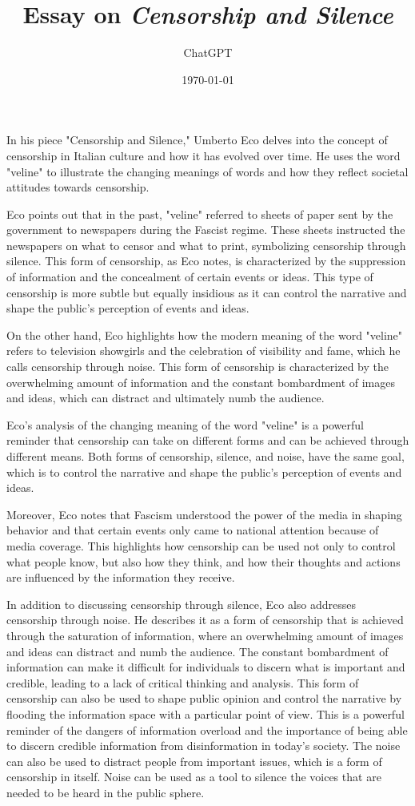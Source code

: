 \documentclass[12pt]{article}
\title{Essay on \emph{Censorship and Silence}}
\author{ChatGPT}
\date{\today}
\begin{document}
\maketitle
In his piece "Censorship and Silence," Umberto Eco delves into the
concept of censorship in Italian culture and how it has evolved
over time. He uses the word "veline" to illustrate the changing
meanings of words and how they reflect societal attitudes towards
censorship.

Eco points out that in the past, "veline" referred to sheets of
paper sent by the government to newspapers during the Fascist regime.
These sheets instructed the newspapers on what to censor and what
to print, symbolizing censorship through silence. This form of
censorship, as Eco notes, is characterized by the suppression of
information and the concealment of certain events or ideas. This
type of censorship is more subtle but equally insidious as it can
control the narrative and shape the public's perception of events
and ideas.

On the other hand, Eco highlights how the modern meaning of the
word "veline" refers to television showgirls and the celebration
of visibility and fame, which he calls censorship through noise.
This form of censorship is characterized by the overwhelming amount
of information and the constant bombardment of images and ideas,
which can distract and ultimately numb the audience.

Eco's analysis of the changing meaning of the word "veline" is a
powerful reminder that censorship can take on different forms and
can be achieved through different means. Both forms of censorship,
silence, and noise, have the same goal, which is to control the
narrative and shape the public's perception of events and ideas.

Moreover, Eco notes that Fascism understood the power of the media
in shaping behavior and that certain events only came to national
attention because of media coverage. This highlights how censorship
can be used not only to control what people know, but also how they
think, and how their thoughts and actions are influenced by the
information they receive.

In addition to discussing censorship through silence, Eco also
addresses censorship through noise. He describes it as a form of
censorship that is achieved through the saturation of information,
where an overwhelming amount of images and ideas can distract and
numb the audience. The constant bombardment of information can make
it difficult for individuals to discern what is important and
credible, leading to a lack of critical thinking and analysis. This
form of censorship can also be used to shape public opinion and
control the narrative by flooding the information space with a
particular point of view. This is a powerful reminder of the dangers
of information overload and the importance of being able to discern
credible information from disinformation in today's society. The
noise can also be used to distract people from important issues,
which is a form of censorship in itself. Noise can be used as a
tool to silence the voices that are needed to be heard in the public
sphere.
\end{document}
